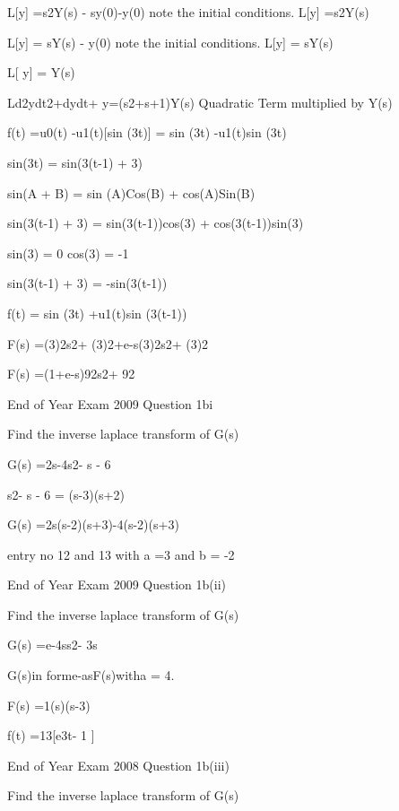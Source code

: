  

L[y] =s2Y(s) - sy(0)-y(0)            note the initial conditions. L[y] =s2Y(s)

 

L[y] = sY(s) - y(0)                           note the initial conditions. L[y] = sY(s) 

 

L[ y] = Y(s)

 

Ld2ydt2+dydt+ y=(s2+s+1)Y(s)    Quadratic Term multiplied by Y(s)


 

 



f(t) =u0(t) -u1(t)[sin (3t)] = sin (3t) -u1(t)sin (3t)


sin(3t) = sin(3(t-1) + 3)


sin(A + B) = sin (A)Cos(B) + cos(A)Sin(B) 


sin(3(t-1) + 3) = sin(3(t-1))cos(3) + cos(3(t-1))sin(3)


sin(3) = 0              cos(3) = -1


sin(3(t-1) + 3) = -sin(3(t-1))


f(t) = sin (3t) +u1(t)sin (3(t-1))


F(s) =(3)2s2+ (3)2+e-s(3)2s2+ (3)2


F(s) =(1+e-s)92s2+ 92


 

End of Year Exam  2009 Question 1bi


Find the inverse laplace transform of G(s)


G(s) =2s-4s2- s - 6


s2- s - 6 = (s-3)(s+2)


G(s) =2s(s-2)(s+3)-4(s-2)(s+3)


entry no 12 and 13 with a =3 and b =  -2



End of Year Exam  2009 Question 1b(ii)

Find the inverse laplace transform of G(s)


G(s) =e-4ss2- 3s



G(s)in forme-asF(s)witha = 4.



F(s) =1(s)(s-3)



f(t) =13[e3t- 1 ]


End of Year Exam  2008 Question 1b(iii)


Find the inverse laplace transform of G(s)


